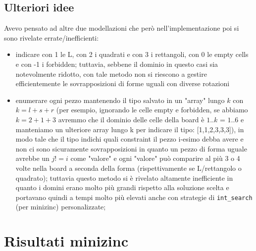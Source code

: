 \documentclass{article}
\begin{document}
\subsection{Ulteriori idee}
Avevo pensato ad altre due modellazioni che però nell'implementazione poi si sono rivelate errate/inefficienti:
\begin{itemize}
    \item indicare con 1 le L, con 2 i quadrati e con 3 i rettangoli, con 0 le empty cells e con -1 i forbidden; tuttavia, sebbene il dominio in questo casi sia notevolmente ridotto, con tale metodo non si riescono a gestire efficientemente le sovrapposizioni di forme uguali con diverse rotazioni
    \item enumerare ogni pezzo mantenendo il tipo salvato in un "array" lungo $k$ con $k=l+s+r$ (per esempio, ignorando le celle empty e forbidden, se abbiamo $k=2+1+3$ avremmo che il dominio delle celle della board è $1..k$ = $1..6$ e manteniamo un ulteriore array lungo k per indicare il tipo: [1,1,2,3,3,3]), in modo tale che il tipo indichi quali constraint il pezzo i-esimo debba avere e non ci sono sicuramente sovrapposizioni in quanto un pezzo di forma uguale avrebbe un $j!=i$ come "valore" e ogni "valore" può comparire al più 3 o 4 volte nella board a seconda della forma (rispettivamente se L/rettangolo o quadrato); tuttavia questo metodo si è rivelato altamente inefficiente in quanto i domini erano molto più grandi rispetto alla soluzione scelta e portavano quindi a tempi molto più elevati anche con strategie di \texttt{int\_search} (per minizinc) personalizzate;
\end{itemize}

\section{Risultati minizinc}
\end{document}
